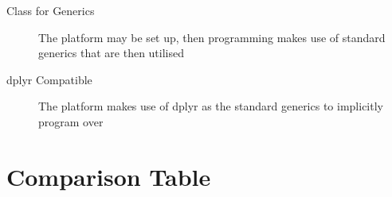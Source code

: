 \documentclass[a4paper,10pt]{article}
\begin{document}
\begin{description}
	\item[Class for Generics] The platform may be set up, then programming makes
	      use of standard generics that are then utilised
	\item[dplyr Compatible] The platform makes use of dplyr as the standard
	      generics to implicitly program over
\end{description}

\section{Comparison Table}\label{sec:comp-tab}
\end{document}
